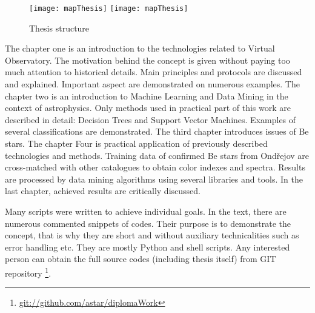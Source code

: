 

\begin{figure}[!htbp]
  \begin{center}
    \leavevmode
    \ifpdf
    \texttt{[image: mapThesis]}
    \else
    \texttt{[image: mapThesis]}
    \fi
    \caption{Thesis structure}
    \label{FigStructure}
  \end{center}
\end{figure}


The chapter one is an introduction to the technologies related to
Virtual Observatory. The motivation behind the concept is given
without paying too much attention to historical details. Main
principles and protocols are discussed and explained. Important aspect
are demonstrated on numerous examples. The chapter two is an
introduction to Machine Learning and Data Mining in the context of
astrophysics. Only methods used in practical part of this work are
described in detail: Decision Trees and Support Vector
Machines. Examples of several classifications are demonstrated. The
third chapter introduces issues of Be stars. The chapter Four is
practical application of previously described technologies and
methods. Training data of confirmed Be stars from Ond\v{r}ejov are
cross-matched with other catalogues to obtain color indexes and
spectra. Results are processed by data mining algorithms using several
libraries and tools. In the last chapter, achieved results are
critically discussed.

Many scripts were written to achieve individual goals. In the text,
there are numerous commented snippets of codes. Their purpose is to
demonstrate the concept, that is why they are short and without
auxiliary technicalities such as error handling etc. They are mostly
Python and shell scripts. Any interested person can obtain the full
source codes (including thesis itself) from GIT repository
\footnote{\url{git://github.com/astar/diplomaWork}}.


